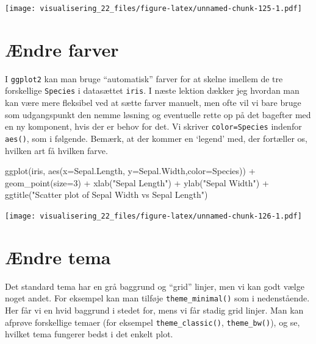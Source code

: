 \documentclass[
]{book}
\newenvironment{Shaded}{\begin{snugshade}}{\end{snugshade}}
\newcommand{\AttributeTok}[1]{\textcolor[rgb]{0.77,0.63,0.00}{#1}}
\newcommand{\DecValTok}[1]{\textcolor[rgb]{0.00,0.00,0.81}{#1}}
\newcommand{\FunctionTok}[1]{\textcolor[rgb]{0.00,0.00,0.00}{#1}}
\newcommand{\NormalTok}[1]{#1}
\newcommand{\SpecialCharTok}[1]{\textcolor[rgb]{0.00,0.00,0.00}{#1}}
\newcommand{\StringTok}[1]{\textcolor[rgb]{0.31,0.60,0.02}{#1}}
\begin{document}
\texttt{[image: visualisering\_22\_files/figure-latex/unnamed-chunk-125-1.pdf]}

\hypertarget{uxe6ndre-farver}{%
\section{Ændre farver}\label{uxe6ndre-farver}}

I \texttt{ggplot2} kan man bruge ``automatisk'' farver for at skelne imellem de tre forskellige \texttt{Species} i datasættet \texttt{iris}. I næste lektion dækker jeg hvordan man kan være mere fleksibel ved at sætte farver manuelt, men ofte vil vi bare bruge som udgangspunkt den nemme løsning og eventuelle rette op på det bagefter med en ny komponent, hvis der er behov for det. Vi skriver \texttt{color=Species} indenfor \texttt{aes()}, som i følgende. Bemærk, at der kommer en `legend' med, der fortæller os, hvilken art få hvilken farve.

\begin{Shaded}
\begin{Highlighting}[]
\FunctionTok{ggplot}\NormalTok{(iris, }\FunctionTok{aes}\NormalTok{(}\AttributeTok{x=}\NormalTok{Sepal.Length, }\AttributeTok{y=}\NormalTok{Sepal.Width,}\AttributeTok{color=}\NormalTok{Species)) }\SpecialCharTok{+}
  \FunctionTok{geom\_point}\NormalTok{(}\AttributeTok{size=}\DecValTok{3}\NormalTok{) }\SpecialCharTok{+}
  \FunctionTok{xlab}\NormalTok{(}\StringTok{"Sepal Length"}\NormalTok{) }\SpecialCharTok{+}
  \FunctionTok{ylab}\NormalTok{(}\StringTok{"Sepal Width"}\NormalTok{) }\SpecialCharTok{+}
  \FunctionTok{ggtitle}\NormalTok{(}\StringTok{"Scatter plot of Sepal Width vs Sepal Length"}\NormalTok{)}
\end{Highlighting}
\end{Shaded}

\texttt{[image: visualisering\_22\_files/figure-latex/unnamed-chunk-126-1.pdf]}

\hypertarget{uxe6ndre-tema}{%
\section{Ændre tema}\label{uxe6ndre-tema}}

Det standard tema har en grå baggrund og ``grid'' linjer, men vi kan godt vælge noget andet. For eksempel kan man tilføje \texttt{theme\_minimal()} som i nedenstående. Her får vi en hvid baggrund i stedet for, mens vi får stadig grid linjer. Man kan afprøve forskellige temaer (for eksempel \texttt{theme\_classic()}, \texttt{theme\_bw()}), og se, hvilket tema fungerer bedst i det enkelt plot.
\end{document}
